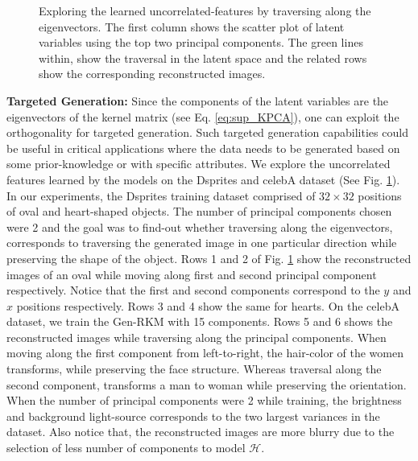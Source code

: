 \documentclass[preview,border=0.3pt]{standalone}
\begin{document}
%
\begin{figure}[h]
	\centering
	
	\caption{Exploring the learned uncorrelated-features by traversing along the eigenvectors. The first column shows the scatter plot of latent variables using the top two principal components. The green lines within, show the traversal in the latent space and the related rows show the corresponding reconstructed images.}
	\label{fig:uncorre}
\end{figure}
%
%
\noindent \textbf{Targeted Generation:}
Since the components of the latent variables are the eigenvectors of the kernel matrix (see Eq. \ref{eq:sup_KPCA}), one can exploit the orthogonality for targeted generation. Such targeted generation capabilities could be useful in critical applications where the data needs to be generated based on some prior-knowledge or with specific attributes.
%
We explore the uncorrelated features learned by the models on the Dsprites and celebA dataset (See Fig. \ref{fig:uncorre}). In our experiments, the Dsprites training dataset comprised of $32\times 32$ positions of oval and heart-shaped objects. The number of principal components chosen were 2 and the goal was to find-out whether traversing along the eigenvectors, corresponds to traversing the generated image in one particular direction while preserving the shape of the object. Rows 1 and 2 of Fig. \ref{fig:uncorre} show the reconstructed images of an oval while moving along first and second principal component respectively. Notice that the first and second components correspond to the $y$ and $x$ positions respectively. Rows 3 and 4 show the same for hearts. On the celebA dataset, we train the Gen-RKM with 15 components. Rows 5 and 6 shows the reconstructed images while traversing along the principal components. When moving along the first component from left-to-right, the hair-color of the women transforms, while preserving the face structure. Whereas traversal along the second component, transforms a man to woman while preserving the orientation. When the number of principal components were 2 while training, the brightness and  background light-source corresponds to the two largest variances in the dataset. Also notice that, the reconstructed images are more blurry due to the selection of less number of components to model $\mathcal{H}$.
%
%
% 
%
\end{document}
